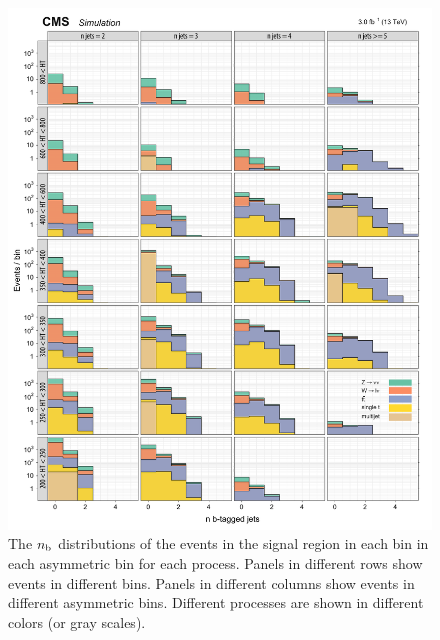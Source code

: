 \begin{figure}[!h]
\centering
\includegraphics[scale=0.95]{figures/kiplots/c150107_s150318_f015_nbjets_40}
\caption{The $n_{\text{b}}$ distributions of the events in the signal region in
each \scalht bin in each asymmetric \njet bin for each process. Panels
in different rows show events in different \scalht bins. Panels in
different columns show events in different asymmetric \njet bins.
Different processes are shown in different colors (or gray scales).}
\label{c150107_s150318_f015_nbjets_40}
\end{figure}

